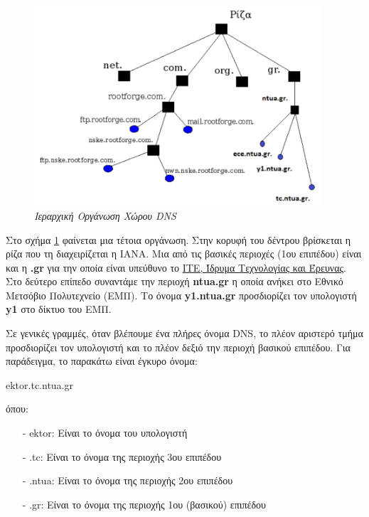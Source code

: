 \begin{figure}[!ht]
  \centering
  \includegraphics[width=0.95\textwidth]{images/chapter6/6-2}
  \caption {\textsl{Ιεραρχική Οργάνωση Χώρου DNS}}
  \label{6-2}
\end{figure}

Στο σχήμα \ref{6-2} φαίνεται μια τέτοια οργάνωση. Στην κορυφή του δέντρου βρίσκεται η ρίζα που τη διαχειρίζεται η ΙΑΝΑ. Μια από τις βασικές περιοχές (1ου επιπέδου) είναι και η \textbf{.gr} για την οποία είναι υπεύθυνο το \href{https://grweb.ics.forth.gr/public/}{ΙΤΕ, Ίδρυμα Τεχνολογίας και Έρευνας}. Στο δεύτερο επίπεδο συναντάμε την περιοχή \textbf{ntua.gr} η οποία ανήκει στο Εθνικό Μετσόβιο Πολυτεχνείο (ΕΜΠ). Το όνομα \textbf{y1.ntua.gr} προσδιορίζει τον υπολογιστή \textbf{y1} στο δίκτυο του ΕΜΠ.

Σε γενικές γραμμές, όταν βλέπουμε ένα πλήρες όνομα DNS, το πλέον αριστερό τμήμα προσδιορίζει τον υπολογιστή και το πλέον δεξιό την περιοχή βασικού επιπέδου. Για παράδειγμα, το παρακάτω είναι έγκυρο όνομα:

\begin{center}
ektor.tc.ntua.gr
\end{center}

όπου:

\begin{itemize}
\item[-]ektor: Είναι το όνομα του υπολογιστή
\item[-].tc: Είναι το όνομα της περιοχής 3ου επιπέδου
\item[-].ntua: Είναι το όνομα της περιοχής 2ου επιπέδου
\item[-].gr: Είναι το όνομα της περιοχής 1ου (βασικού) επιπέδου
\end{itemize}

